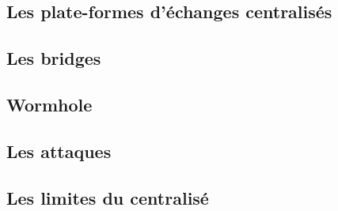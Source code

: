 \subsection{Les plate-formes d'échanges centralisés}


\subsection{Les bridges}


\subsection{Wormhole}


\subsection{Les attaques}


\subsection{Les limites du centralisé}
